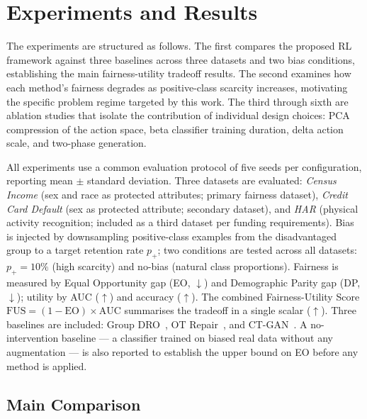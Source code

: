 
\section{Experiments and Results}
\label{sec:experiments}

The experiments are structured as follows.
The first compares the proposed RL framework against three baselines across
three datasets and two bias conditions, establishing the main fairness-utility
tradeoff results.
The second examines how each method's fairness degrades as positive-class
scarcity increases, motivating the specific problem regime targeted by this
work.
The third through sixth are ablation studies that isolate the contribution of
individual design choices: PCA compression of the action space, beta classifier
training duration, delta action scale, and two-phase generation.

All experiments use a common evaluation protocol of five seeds per
configuration, reporting mean $\pm$ standard deviation.
Three datasets are evaluated: \textit{Census Income} (sex and race as protected
attributes; primary fairness dataset), \textit{Credit Card Default} (sex as
protected attribute; secondary dataset), and \textit{HAR} (physical activity
recognition; included as a third dataset per funding requirements).
Bias is injected by downsampling positive-class examples from the disadvantaged
group to a target retention rate $p_+$; two conditions are tested across all
datasets: $p_+ = 10\%$ (high scarcity) and no-bias (natural class proportions).
Fairness is measured by Equal Opportunity gap (EO, $\downarrow$) and
Demographic Parity gap (DP, $\downarrow$); utility by AUC ($\uparrow$) and
accuracy ($\uparrow$).
The combined Fairness-Utility Score $\text{FUS} = (1 - \text{EO}) \times
\text{AUC}$ summarises the tradeoff in a single scalar ($\uparrow$).
Three baselines are included: Group DRO~\cite{sagawa2020groupdro},
OT Repair~\cite{black2020repair}, and CT-GAN~\cite{xu2019ctgan}.
A no-intervention baseline — a classifier trained on biased real data without
any augmentation — is also reported to establish the upper bound on EO before
any method is applied.

\subsection{Main Comparison}
\label{sec:results:main}


